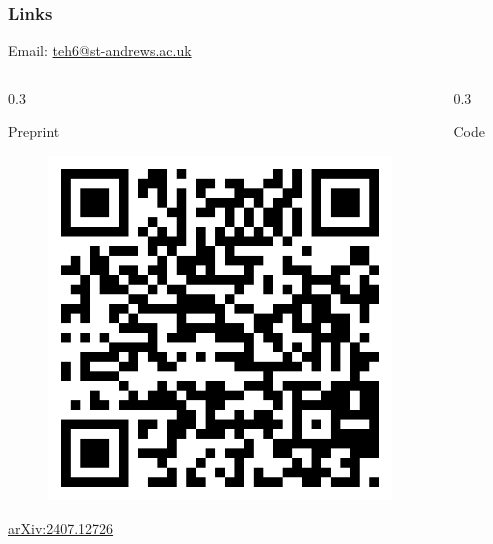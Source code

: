 \documentclass[compress,handout]{beamer}
\begin{document}
\begin{frame}
  \frametitle{Links}

  \begin{center}
    {\large Email: {\href{mailto:teh6@st-andrews.ac.uk}{teh6@st-andrews.ac.uk}}}
  \end{center}

  \vspace*{-4mm}

  \begin{columns}
  \begin{column}{0.3\framewidth}
    \begin{center}
      Preprint
      \begin{figure}
        \includegraphics[width=\textwidth]{arxiv-qr.png}
      \end{figure}
      \href{https://doi.org/10.48550/arXiv.2407.12726}{arXiv:2407.12726}\vspace*{12mm}
    \end{center}
  \end{column}
  \begin{column}{0.3\framewidth}
    \begin{center}
      Code
      \begin{figure}

\end{figure}
\end{center}
\end{column}
\end{columns}
\end{frame}
\end{document}
